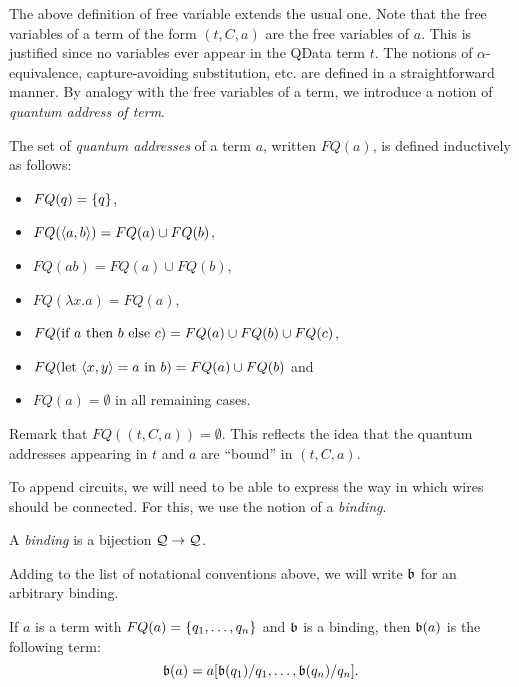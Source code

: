 \documentclass{article}
\begin{document}
The above definition of free variable extends the usual one. Note 
that the free variables of a term of the form $(t,C,a)$ are the 
free variables of $a$. This is justified since no variables ever 
appear in the QData term $t$. The notions of $\alpha$-equivalence, 
capture-avoiding substitution, etc. are defined in a straightforward 
manner. By analogy with the free variables of a term, we introduce a 
notion of \emph{quantum address of term}.

\begin{definition}
The set of \emph{quantum addresses} of a term $a$, written $FQ(a)$, is 
defined inductively as follows:
\begin{itemize}
  \item $FQ(q)=\{q\}$,
  \item $FQ(\langle a,b\rangle)=FQ(a)\cup FQ(b)$,
  \item $FQ(ab)=FQ(a)\cup FQ(b)$,
  \item $FQ(\lambda x.a)=FQ(a)$,
  \item $FQ(\text{if}~ a ~\text{then}~ b ~\text{else}~ c) = FQ(a) \cup FQ(b) \cup FQ(c)$,
  \item $FQ(\text{let}~ \langle x,y\rangle = a ~\text{in}~ b)= FQ(a)\cup FQ(b)$ and
  \item $FQ(a)=\emptyset$ in all remaining cases.
\end{itemize}
\end{definition}

Remark that $FQ((t,C,a))=\emptyset$. This reflects the idea that the 
quantum addresses appearing in $t$ and $a$ are ``bound'' in $(t,C,a)$. 

To append circuits, we will need to be able to express the way in 
which wires should be connected. For this, we use the notion of a 
\emph{binding}.

\begin{definition}
A \emph{binding} is a bijection $\mathcal{Q}\to \mathcal{Q}$.
\end{definition}


Adding to the list of notational conventions above, we will write 
$\mathfrak{b}$ for an arbitrary binding. 

\begin{definition}
If $a$ is a term with $FQ(a)=\{q_1,\ldots,q_n\}$ and $\mathfrak{b}$ is 
a binding, then $\mathfrak{b}(a)$ is the following term:
\[
\mathfrak{b}(a)= a[\mathfrak{b}(q_1)/q_1,\ldots ,\mathfrak{b}(q_n)/q_n].
\]
\end{definition}
\end{document}

